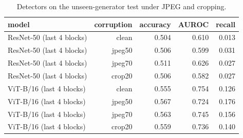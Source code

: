 \begin{table}[t]
\centering
\caption{Detectors on the unseen-generator test under JPEG and cropping.}
\label{tab:tab_robustness}
\begin{tabular}{lrrrr}
\toprule
model & corruption & accuracy & AUROC & recall \\
\midrule
ResNet-50 (last 4 blocks) & clean & 0.504 & 0.610 & 0.013 \\
ResNet-50 (last 4 blocks) & jpeg50 & 0.506 & 0.599 & 0.031 \\
ResNet-50 (last 4 blocks) & jpeg70 & 0.511 & 0.626 & 0.027 \\
ResNet-50 (last 4 blocks) & crop20 & 0.506 & 0.582 & 0.027 \\
ViT-B/16 (last 4 blocks) & clean & 0.555 & 0.754 & 0.126 \\
ViT-B/16 (last 4 blocks) & jpeg50 & 0.567 & 0.724 & 0.176 \\
ViT-B/16 (last 4 blocks) & jpeg70 & 0.563 & 0.745 & 0.156 \\
ViT-B/16 (last 4 blocks) & crop20 & 0.559 & 0.736 & 0.140 \\
\bottomrule
\end{tabular}
\end{table}

